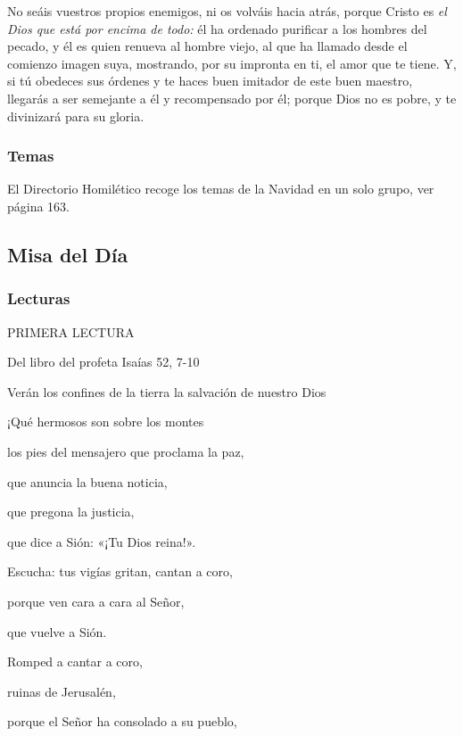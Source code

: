 \documentclass[]{article}
\begin{document}
No seáis vuestros propios enemigos, ni os volváis hacia atrás, porque
Cristo es \emph{el Dios que está por encima de todo:} él ha ordenado
purificar a los hombres del pecado, y él es quien renueva al hombre
viejo, al que ha llamado desde el comienzo imagen suya, mostrando, por
su impronta en ti, el amor que te tiene. Y, si tú obedeces sus órdenes y
te haces buen imitador de este buen maestro, llegarás a ser semejante a
él y recompensado por él; porque Dios no es pobre, y te divinizará para
su
gloria.\protect\hypertarget{_Toc448662797}{}{\protect\hypertarget{_Toc448690316}{}{\protect\hypertarget{_Toc448708339}{}{\protect\hypertarget{_Toc448709425}{}{\protect\hypertarget{_Toc449554427}{}{}}}}}

\subsubsection{Temas}\label{temas-6}

El Directorio Homilético recoge los temas de la Navidad en un solo
grupo, ver página 163.

\subsection{Misa del Día}\label{misa-del-duxeda}

\subsubsection{Lecturas}\label{lecturas-7}

PRIMERA LECTURA

Del libro del profeta Isaías 52, 7-10

Verán los confines de la tierra la salvación de nuestro Dios

¡Qué hermosos son sobre los montes

los pies del mensajero que proclama la paz,

que anuncia la buena noticia,

que pregona la justicia,

que dice a Sión: «¡Tu Dios reina!».

Escucha: tus vigías gritan, cantan a coro,

porque ven cara a cara al Señor,

que vuelve a Sión.

Romped a cantar a coro,

ruinas de Jerusalén,

porque el Señor ha consolado a su pueblo,
\end{document}
